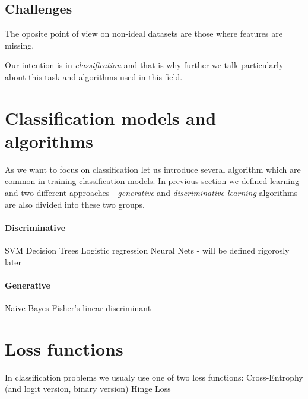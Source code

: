 \subsection{Challenges}
The oposite point of view on non-ideal datasets are those where features are missing. 

Our intention is in \emph{classification} and that is why further we talk particularly about this task and algorithms used in this field.

\section{Classification models and algorithms}
As we want to focus on classification let us introduce several algorithm which are common in training classification models. In previous section we defined learning and two different approaches - \emph{generative} and \emph{discriminative learning} algorithms are also divided into these two groups.
\paragraph{Discriminative}
SVM
Decision Trees
Logistic regression
Neural Nets - will be defined rigorosly later

\paragraph{Generative}
Naive Bayes
Fisher's linear discriminant

\section{Loss functions}
In classification problems we usualy use one of two loss functions:
Cross-Entrophy (and logit version, binary version)
Hinge Loss

